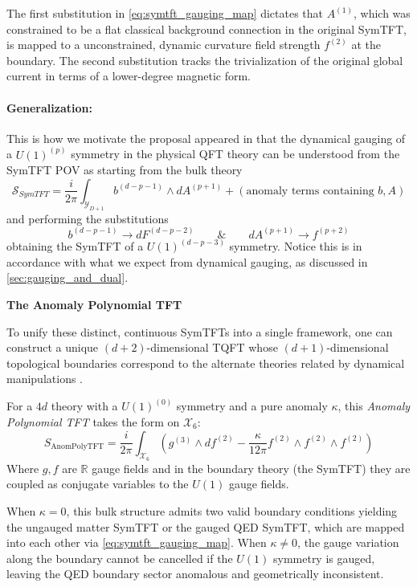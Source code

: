 \documentclass[aps,preprint,nofootinbib,preprintnumbers,eqsecnum,superscriptaddress]{revtex4}
\numberwithin{equation}{section}
\begin{document}
The first substitution in \eqref{eq:symtft_gauging_map} dictates that $A^{(1)}$, which was constrained to be a flat classical background connection in the original SymTFT, is mapped to a unconstrained, dynamic curvature field strength $f^{(2)}$ at the boundary. The second substitution tracks the trivialization of the original global current in terms of a lower-degree magnetic form.

\paragraph*{Generalization:} This is how we motivate the proposal appeared in \cite{Antinucci_2025} that the dynamical gauging of a $U(1)^{(p)}$ symmetry in the physical QFT theory can be understood from the SymTFT POV as starting from the bulk theory
\begin{equation}
    \mathcal{S}_{SymTFT} = \frac{i}{2\pi} \int_{\mathcal{Y}_{D+1}} b^{(d-p-1)} \wedge dA^{(p+1)} + (\text{anomaly terms containing $b,A$})
\end{equation}
and performing the substitutions
\begin{equation}
    b^{(d-p-1)} \to dF^{(d-p-2)} \qquad \& \qquad dA^{(p+1)} \to f^{(p+2)}
\end{equation}
obtaining the SymTFT of a $U(1)^{(d-p-3)}$ symmetry. Notice this is in accordance with what we expect from dynamical gauging, as discussed in \ref{sec:gauging_and_dual}.

\begin{tcolorbox}
{\bf The Anomaly Polynomial TFT}

To unify these distinct, continuous SymTFTs into a single framework, one can construct a unique $(d+2)$-dimensional TQFT whose $(d+1)$-dimensional topological boundaries correspond to the alternate theories related by dynamical manipulations \cite{Antinucci_2025}. 

For a $4d$ theory with a $U(1)^{(0)}$ symmetry and a pure anomaly $\kappa$, this \textit{Anomaly Polynomial TFT} takes the form on $\mathcal{X}_6$:
\begin{equation}
    S_{\text{AnomPolyTFT}} = \frac{i}{2\pi} \int_{\mathcal{X}_6} \left( g^{(3)} \wedge df^{(2)} - \frac{\kappa}{12\pi} f^{(2)} \wedge f^{(2)} \wedge f^{(2)} \right)
\end{equation}
Where $g,f$ are $\mathbb{R}$ gauge fields and in the boundary theory (the SymTFT) they are coupled as conjugate variables to the $U(1)$ gauge fields.

When $\kappa = 0$, this bulk structure admits two valid boundary conditions yielding the ungauged matter SymTFT or the gauged QED SymTFT, which are mapped into each other via \eqref{eq:symtft_gauging_map}. When $\kappa \neq 0$, the gauge variation along the boundary cannot be cancelled if the $U(1)$ symmetry is gauged, leaving the QED boundary sector anomalous and geometrically inconsistent. 
\end{tcolorbox}
\end{document}
